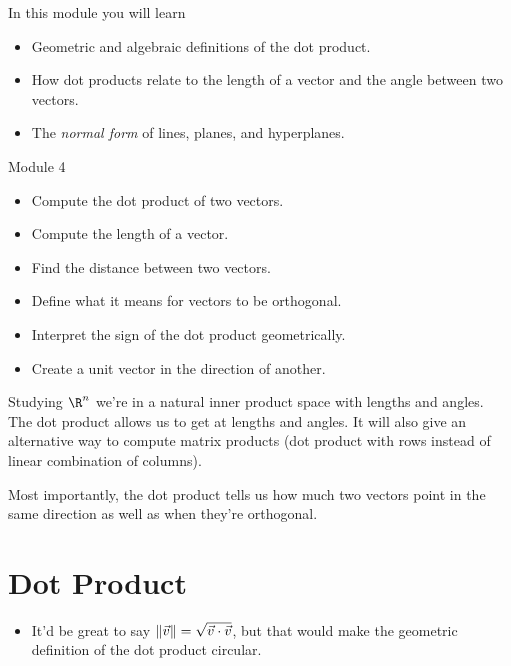 \begin{module}

	In this module you will learn
	\begin{itemize}
		\item Geometric and algebraic definitions of the dot product.
		\item How dot products relate to the length of a vector and the angle
			between two vectors.
		\item The \emph{normal form} of lines, planes, and hyperplanes.
	\end{itemize}

	
	
\end{module}

\begin{lesson}

	Module 4

	\begin{itemize}
		\item Compute the dot product of two vectors.
		\item Compute the length of a vector.
		\item Find the distance between two vectors.
		\item Define what it means for vectors to be orthogonal.
		\item Interpret the sign of the dot product geometrically.
		\item Create a unit vector in the direction of another.
	\end{itemize}

	Studying $\R^n$ we're in a natural inner product space with lengths and
	angles. The dot product allows us to get at lengths and angles. It will
	also give an alternative way to compute matrix products (dot product with rows
	instead of linear combination of columns).

	Most importantly, the dot product tells us how much two vectors point in
	the same direction as well as when they're orthogonal.

\end{lesson}


	\bookonlynewpage
\section*{Dot Product}
	\begin{annotation}
		\begin{notes}
			\begin{itemize}
				\item It'd be great to say $\lVert\vec v\rVert=\sqrt{\vec v\cdot \vec v}$,
					but that would make the geometric definition of the dot product circular.
			\end{itemize}
		\end{notes}
	\end{annotation}

